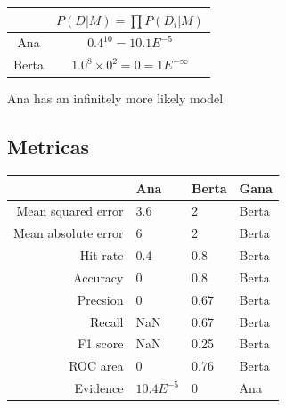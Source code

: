 \documentclass[shownotes]{beamer}
\begin{document}
\begin{frame}
\pause


\pause \vspace{0.2cm}

  \begin{table}[H]
\begin{tabular}{c|c}
 & $P(D|M) = \prod P(D_i|M)$ \\ \hline
 Ana &  $0.4^{10}= 10.1E^{-5}$  \\
Berta & $1.0^8  \times 0^2 = 0 = 1E^{-\infty}$\\
 \end{tabular}
\end{table}
\vspace{-0.1cm}
\begin{framed}
\centering 

Ana has an infinitely more likely model
\end{framed}


\end{frame}



\subsection{Metricas}

\begin{frame}
\begin{table}[H]
\centering
\begin{tabular}{rlll}
  \hline
 & Ana & Berta & Gana \\ 
  \hline
Mean squared error & 3.6 & 2 & Berta \\ 
  Mean absolute error & 6 & 2 & Berta \\ 
  Hit rate & 0.4 & 0.8 & Berta \\ 
  Accuracy & 0 & 0.8 & Berta \\ 
  Precsion & 0 & 0.67 & Berta \\ 
  Recall & NaN & 0.67 & Berta \\ 
  F1 score & NaN & 0.25 & Berta \\ 
  ROC area & 0 & 0.76 & Berta \\ 
  Evidence & $10.4E^{-5}$ & 0 & Ana \\ 
   \hline
\end{tabular}
\end{table}


\end{frame}
\end{document}
